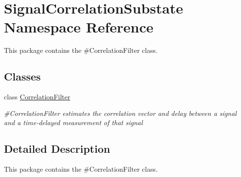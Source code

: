 \hypertarget{namespaceSignalCorrelationSubstate}{}\section{Signal\+Correlation\+Substate Namespace Reference}
\label{namespaceSignalCorrelationSubstate}


This package contains the \#\+Correlation\+Filter class.  


\subsection*{Classes}
\begin{DoxyCompactItemize}
\item 
class \hyperlink{classSignalCorrelationSubstate_1_1CorrelationFilter}{Correlation\+Filter}
\begin{DoxyCompactList}\small\item\em \#\+Correlation\+Filter estimates the correlation vector and delay between a signal and a time-\/delayed measurement of that signal \end{DoxyCompactList}\end{DoxyCompactItemize}


\subsection{Detailed Description}
This package contains the \#\+Correlation\+Filter class. 
